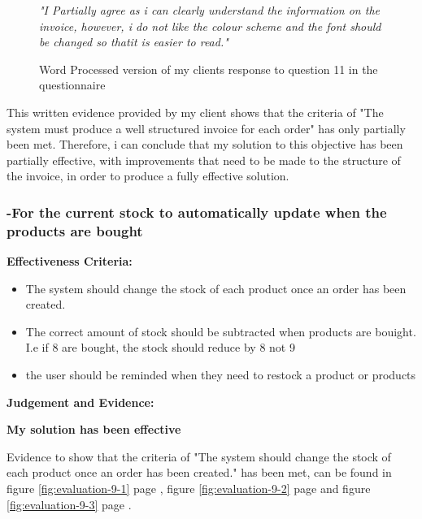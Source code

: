 \begin{figure}[H]
\caption{Word Processed version of my clients response to question 11 in the questionnaire}
\vspace{3mm}
\textit{\large{"I Partially agree as i can clearly understand the information on the invoice, however, i do not like the colour scheme and the font should be changed so thatit is easier to read."}}
\vspace{3mm}
\end{figure}

This written evidence provided by my client shows that the criteria of "The system must produce a well structured invoice for each order" has only partially been met. Therefore, i can conclude that my solution to this objective has been partially effective, with improvements that need to be made to the structure of the invoice, in order to produce a fully effective solution.












\pagebreak
\subsubsection{-For the current stock to automatically update when the products are bought}

\textbf{Effectiveness Criteria:}\newline
\begin{itemize}
	\item{The system should change the stock of each product once an order has been created.}
	\item{The correct amount of stock should be subtracted when products are bouight. I.e if 8 are bought, the stock should reduce by 8 not 9}
	\item {the user should be reminded when they need to restock a product or products}
\end{itemize}

\textbf{Judgement and Evidence:} \newline

\textbf{\large{My solution has been effective}}

Evidence to show that the criteria of "The system should change the stock of each product once an order has been created." has been met, can be found in figure \ref{fig:evaluation-9-1} page \pageref{fig:evaluation-9-1}, figure \ref{fig:evaluation-9-2} page \pageref{fig:evaluation-9-2} and figure \ref{fig:evaluation-9-3} page \pageref{fig:evaluation-9-3}. 

